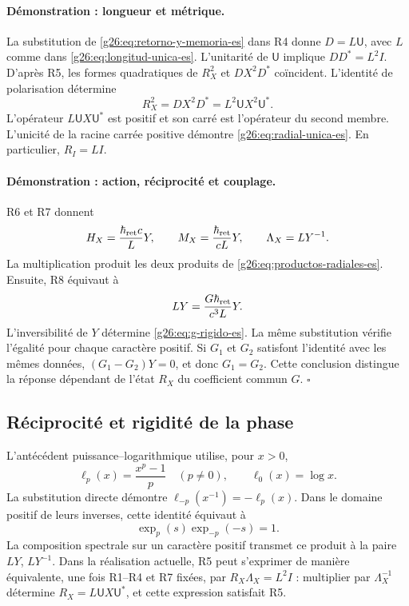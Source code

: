 \paragraph{Démonstration : longueur et métrique.}
La substitution de \eqref{g26:eq:retorno-y-memoria-es} dans R4 donne
\(D=L\mathsf U\), avec \(L\) comme dans \eqref{g26:eq:longitud-unica-es}.
L'unitarité de \(\mathsf U\) implique \(DD^*=L^2I\).
D'après R5, les formes quadratiques de \(R_X^2\) et \(DX^2D^*\) coïncident.
L'identité de polarisation détermine
\[
 R_X^2=DX^2D^*=L^2\mathsf U X^2\mathsf U^*.
\]
L'opérateur \(L\mathsf U X\mathsf U^*\) est positif et son carré est l'opérateur du second membre. L'unicité de la racine carrée positive démontre \eqref{g26:eq:radial-unica-es}. En particulier, \(R_I=LI\).

\paragraph{Démonstration : action, réciprocité et couplage.}
R6 et R7 donnent
\[
 H_X=\frac{\hbar_{\rm ret}c}{L}Y,
 \qquad M_X=\frac{\hbar_{\rm ret}}{cL}Y,
 \qquad \Lambda_X=LY^{-1}.
\]
La multiplication produit les deux produits de
\eqref{g26:eq:productos-radiales-es}. Ensuite, R8 équivaut à
\[
 LY=\frac{G\hbar_{\rm ret}}{c^3L}Y.
\]
L'inversibilité de \(Y\) détermine \eqref{g26:eq:g-rigido-es}.
La même substitution vérifie l'égalité pour chaque caractère positif.
Si \(G_1\) et \(G_2\) satisfont l'identité avec les mêmes données,
\((G_1-G_2)Y=0\), et donc \(G_1=G_2\).
Cette conclusion distingue la réponse dépendant de l'état
\(R_X\) du coefficient commun \(G\). \hfill\(\square\)

\subsection{Réciprocité et rigidité de la phase}

L'antécédent puissance--logarithmique utilise, pour \(x>0\),
\[
 \ell_p(x)=\frac{x^p-1}{p}\quad(p\ne0),
 \qquad \ell_0(x)=\log x.
\]
La substitution directe démontre
\(\ell_{-p}(x^{-1})=-\ell_p(x)\). Dans le domaine positif de leurs
inverses, cette identité équivaut à
\[
 \exp_p(s)\exp_{-p}(-s)=1.
\]
La composition spectrale sur un caractère positif transmet ce produit à la paire \(LY\), \(LY^{-1}\). Dans la réalisation actuelle, R5 peut s'exprimer de manière équivalente, une fois R1--R4 et R7 fixées, par \(R_X\Lambda_X=L^2I\) : multiplier par \(\Lambda_X^{-1}\) détermine \(R_X=L\mathsf U X\mathsf U^*\), et cette expression satisfait R5.

